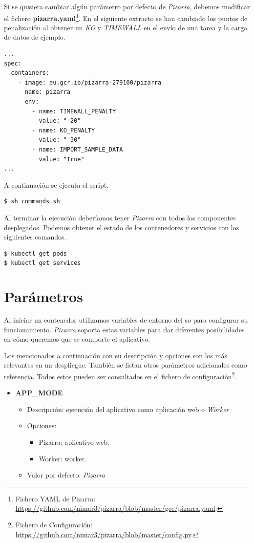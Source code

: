 \documentclass[11pt,spanish,listoffigures,listoftables]{tfgetsinf}
\begin{document}
Si se quisiera cambiar algún parámetro por defecto de \textit{Pizarra}, debemos modificar el fichero \textbf{pizarra.yaml}\footnote{Fichero YAML de Pizarra: \url{https://github.com/nimar3/pizarra/blob/master/gce/pizarra.yaml}.}. En el siguiente extracto se han cambiado los puntos de penalización al obtener un \textit{KO} y \textit{TIMEWALL} en el envío de una \Gls{tarea} y la carga de datos de ejemplo.

\begin{lstlisting}[style=ascii-tree]
...
spec:
  containers:
    - image: eu.gcr.io/pizarra-279100/pizarra
      name: pizarra
      env:
        - name: TIMEWALL_PENALTY
          value: "-20"
        - name: KO_PENALTY
          value: "-30"
        - name: IMPORT_SAMPLE_DATA
          value: "True"
...          
\end{lstlisting}

A continuación se ejecuta el script.

\begin{lstlisting}[style=ascii-tree]
$ sh commands.sh
\end{lstlisting}

Al terminar la ejecución deberíamos tener \textit{Pizarra} con todos los componentes desplegados. Podemos obtener el estado de los \gls{contenedor}es y servicios con los siguientes comandos.

\begin{lstlisting}[style=ascii-tree]
$ kubectl get pods
$ kubectl get services
\end{lstlisting}

\section{Parámetros}

Al iniciar un \Gls{contenedor} utilizamos variables de entorno del \acrshort{so} para configurar su funcionamiento. \textit{Pizarra} soporta estas variables para dar diferentes posibilidades en cómo queremos que se comporte el aplicativo. 

Los mencionados a continuación con su descripción y opciones son los más relevantes en un despliegue. También se listan otros parámetros adicionales como referencia. Todos estos pueden ser consultados en el fichero de configuración\footnote{Fichero de Configuración: \url{https://github.com/nimar3/pizarra/blob/master/config.py}.}.

\begin{itemize}
	\item \textbf{APP\_MODE}
	\begin{itemize}
		\item Descripción: ejecución del aplicativo como aplicación web o \textit{Worker}
		\item Opciones:
		\begin{itemize}
			\item Pizarra: aplicativo web.
			\item Worker: worker.
		\end{itemize}
		\item Valor por defecto: \textit{Pizarra}
	\end{itemize}
\end{itemize}
\end{document}
